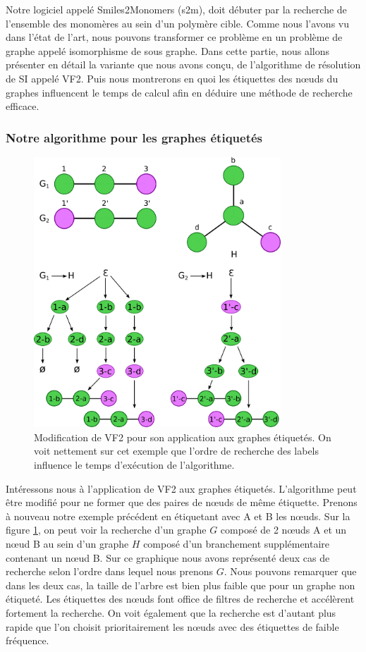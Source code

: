 \label{isomorphisme_p}

Notre logiciel appelé Smiles2Monomers (s2m), doit débuter par la recherche de l'ensemble des monomères au sein d'un polymère cible.
Comme nous l'avons vu dans l'état de l'art, nous pouvons transformer ce problème en un problème de graphe appelé isomorphisme de sous graphe.
Dans cette partie, nous allons présenter en détail la variante que nous avons conçu, de l'algorithme de résolution de SI appelé VF2.
Puis nous montrerons en quoi les étiquettes des n\oe{}uds du graphes influencent le temps de calcul afin en déduire une méthode de recherche efficace.

\subsubsection{Notre algorithme pour les graphes étiquetés}


\begin{figure}[!ht]
  \begin{center}
    \includegraphics[width=350px]{Figures/s2m/recherche/VF2_labels.png}
    \caption{\label{vf2_labels}Modification de VF2 pour son application aux graphes étiquetés.
    On voit nettement sur cet exemple que l'ordre de recherche des labels influence le temps d'exécution de l'algorithme.}
  \end{center}
\end{figure}

Intéressons nous à l'application de VF2 aux graphes étiquetés.
L'algorithme peut être modifié pour ne former que des paires de n\oe{}uds de même étiquette.
Prenons à nouveau notre exemple précédent en étiquetant avec A et B les n\oe{}uds.
Sur la figure \ref{vf2_labels}, on peut voir la recherche d'un graphe $G$ composé de 2 n\oe{}uds A et un n\oe{}ud B au sein d'un graphe $H$
composé d'un branchement supplémentaire contenant un n\oe{}ud B.
Sur ce graphique nous avons représenté deux cas de recherche selon l'ordre dans lequel nous prenons $G$.
Nous pouvons remarquer que dans les deux cas, la taille de l'arbre est bien plus faible que pour un graphe non étiqueté.
Les étiquettes des n\oe{}uds font office de filtres de recherche et accélèrent fortement la recherche.
On voit également que la recherche est d'autant plus rapide que l'on choisit prioritairement les n\oe{}uds avec des étiquettes de faible fréquence.

